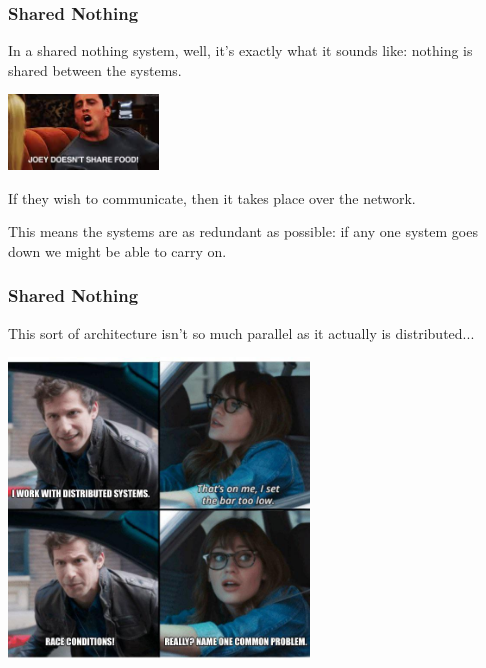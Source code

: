 \begin{frame}
\frametitle{Shared Nothing}

In a shared nothing system, well, it's exactly what it sounds like: nothing is shared between the systems. 

\begin{center}
	\includegraphics[width=0.3\textwidth]{images/sharefood.jpg}
\end{center}

If they wish to communicate, then it takes place over the network. 

This means the systems are as redundant as possible: if any one system goes down we might be able to carry on. 

\end{frame}

\begin{frame}
\frametitle{Shared Nothing}

This sort of architecture isn't so much parallel as it actually is \alert{distributed}...

\begin{center}
	\includegraphics[width=0.6\textwidth]{images/distributed.jpg}
\end{center}


\end{frame}




